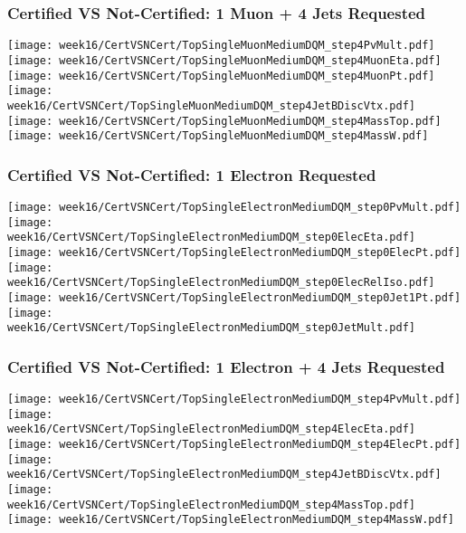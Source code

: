 \documentclass{beamer}
\begin{document}
\begin{frame}
\frametitle{Certified VS Not-Certified: 1 Muon + 4 Jets Requested}
\hspace{-0.7cm}
\texttt{[image: week16/CertVSNCert/TopSingleMuonMediumDQM\_step4PvMult.pdf]}
\texttt{[image: week16/CertVSNCert/TopSingleMuonMediumDQM\_step4MuonEta.pdf]}
\texttt{[image: week16/CertVSNCert/TopSingleMuonMediumDQM\_step4MuonPt.pdf]}\\
\hspace{-0.7cm}
\texttt{[image: week16/CertVSNCert/TopSingleMuonMediumDQM\_step4JetBDiscVtx.pdf]}
\texttt{[image: week16/CertVSNCert/TopSingleMuonMediumDQM\_step4MassTop.pdf]}
\texttt{[image: week16/CertVSNCert/TopSingleMuonMediumDQM\_step4MassW.pdf]}
\end{frame}

\begin{frame}
\frametitle{Certified VS Not-Certified: 1 Electron Requested}
\hspace{-0.7cm}
\texttt{[image: week16/CertVSNCert/TopSingleElectronMediumDQM\_step0PvMult.pdf]}
\texttt{[image: week16/CertVSNCert/TopSingleElectronMediumDQM\_step0ElecEta.pdf]}
\texttt{[image: week16/CertVSNCert/TopSingleElectronMediumDQM\_step0ElecPt.pdf]}\\
\hspace{-0.7cm}
\texttt{[image: week16/CertVSNCert/TopSingleElectronMediumDQM\_step0ElecRelIso.pdf]}
\texttt{[image: week16/CertVSNCert/TopSingleElectronMediumDQM\_step0Jet1Pt.pdf]}
\texttt{[image: week16/CertVSNCert/TopSingleElectronMediumDQM\_step0JetMult.pdf]}
\end{frame}


\begin{frame}
\frametitle{Certified VS Not-Certified: 1 Electron + 4 Jets Requested}
\hspace{-0.7cm}
\texttt{[image: week16/CertVSNCert/TopSingleElectronMediumDQM\_step4PvMult.pdf]}
\texttt{[image: week16/CertVSNCert/TopSingleElectronMediumDQM\_step4ElecEta.pdf]}
\texttt{[image: week16/CertVSNCert/TopSingleElectronMediumDQM\_step4ElecPt.pdf]}\\
\hspace{-0.7cm}
\texttt{[image: week16/CertVSNCert/TopSingleElectronMediumDQM\_step4JetBDiscVtx.pdf]}
\texttt{[image: week16/CertVSNCert/TopSingleElectronMediumDQM\_step4MassTop.pdf]}
\texttt{[image: week16/CertVSNCert/TopSingleElectronMediumDQM\_step4MassW.pdf]}
\end{frame}
\end{document}
